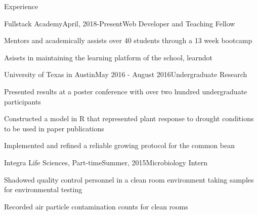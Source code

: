 \documentclass{resume} %
\begin{document}
    
    
    \begin{rSection}{Experience}
    \begin{rSubsection}{Fullstack Academy}{April, 2018-Present}{Web Developer and Teaching Fellow}{}
    \item Mentors and academically assists over 40 students through a 13 week bootcamp
    \item Asissts in maintaining the learning platform of the school, learndot
    \end{rSubsection}

    \begin{rSubsection}{University of Texas in Austin}{May 2016 - August 2016}{Undergraduate Research}{}
    \item Presented results at a poster conference with over two hundred undergraduate participants
    \item Constructed a model in R that represented plant response to drought conditions to be used in paper publications
    \item Implemented and refined a reliable growing protocol for the common bean
    \end{rSubsection}

    
    \begin{rSubsection}{Integra Life Sciences, Part-time}{Summer, 2015}{Microbiology Intern}{}
    \item Shadowed quality control personnel in a clean room environment taking samples for environmental testing
    \item Recorded air particle contamination counts for clean rooms
    \end{rSubsection}
    \end{rSection}

    
    
\end{document}

